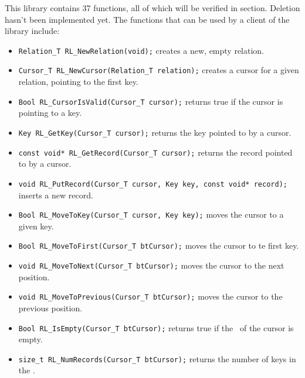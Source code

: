 This library contains 37 functions, all of which will be verified in section.
Deletion hasn't been implemented yet.
The functions that can be used by a client of the library include:
\begin{itemize}
\item \lstinline{Relation_T RL_NewRelation(void);}  creates a new, empty relation.
\item \lstinline{Cursor_T RL_NewCursor(Relation_T relation);}  creates a cursor for a given relation, pointing to the first key.
\item \lstinline{Bool RL_CursorIsValid(Cursor_T cursor);}  returns true if the cursor is pointing to a key.
\item \lstinline{Key RL_GetKey(Cursor_T cursor);}  returns the key pointed to by a cursor.
\item \lstinline{const void* RL_GetRecord(Cursor_T cursor);}  returns the record pointed to by a cursor.
\item \lstinline{void RL_PutRecord(Cursor_T cursor, Key key, const void* record);}  inserts a new record.
\item \lstinline{Bool RL_MoveToKey(Cursor_T cursor, Key key);}  moves the cursor to a given key.
\item \lstinline{Bool RL_MoveToFirst(Cursor_T btCursor);}  moves the cursor to te first key.
\item \lstinline{void RL_MoveToNext(Cursor_T btCursor);}  moves the cursor to the next position.
\item \lstinline{void RL_MoveToPrevious(Cursor_T btCursor);}  moves the cursor to the previous position.
\item \lstinline{Bool RL_IsEmpty(Cursor_T btCursor);}  returns true if the \btree\ of the cursor is empty.
\item \lstinline{size_t RL_NumRecords(Cursor_T btCursor);}  returns the number of keys in the \btree.
\end{itemize}


